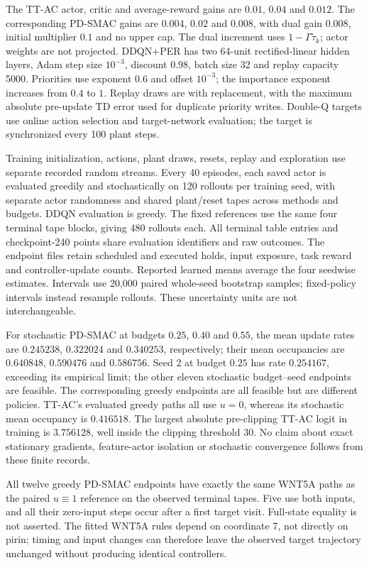\documentclass[11pt]{article}
\newcommand{\1}{\mathbf{1}}
\begin{document}
The TT-AC actor, critic and average-reward gains are $0.01$, $0.04$ and $0.012$. The corresponding PD-SMAC gains are $0.004$, $0.02$ and $0.008$, with dual gain $0.008$, initial multiplier $0.1$ and no upper cap. The dual increment uses $1-\Gamma\tilde\tau_k$; actor weights are not projected. DDQN+PER has two 64-unit rectified-linear hidden layers, Adam step size $10^{-3}$, discount $0.98$, batch size 32 and replay capacity 5000. Priorities use exponent $0.6$ and offset $10^{-3}$; the importance exponent increases from $0.4$ to $1$. Replay draws are with replacement, with the maximum absolute pre-update TD error used for duplicate priority writes. Double-Q targets use online action selection and target-network evaluation; the target is synchronized every 100 plant steps. 

Training initialization, actions, plant draws, resets, replay and exploration use separate recorded random streams. Every 40 episodes, each saved actor is evaluated greedily and stochastically on 120 rollouts per training seed, with separate actor randomness and shared plant/reset tapes across methods and budgets. DDQN evaluation is greedy. The fixed references use the same four terminal tape blocks, giving 480 rollouts each. All terminal table entries and checkpoint-240 points share evaluation identifiers and raw outcomes. The endpoint files retain scheduled and executed holds, input exposure, task reward and controller-update counts. Reported learned means average the four seedwise estimates. Intervals use 20,000 paired whole-seed bootstrap samples; fixed-policy intervals instead resample rollouts. These uncertainty units are not interchangeable.

For stochastic PD-SMAC at budgets $0.25$, $0.40$ and $0.55$, the mean update rates are $0.245238$, $0.322024$ and $0.340253$, respectively; their mean occupancies are $0.640848$, $0.590476$ and $0.586756$. Seed 2 at budget $0.25$ has rate $0.254167$, exceeding its empirical limit; the other eleven stochastic budget--seed endpoints are feasible. The corresponding greedy endpoints are all feasible but are different policies. TT-AC's evaluated greedy paths all use $u=0$, whereas its stochastic mean occupancy is $0.416518$. The largest absolute pre-clipping TT-AC logit in training is $3.756128$, well inside the clipping threshold 30. No claim about exact stationary gradients, feature-actor isolation or stochastic convergence follows from these finite records.

All twelve greedy PD-SMAC endpoints have exactly the same WNT5A paths as the paired $u\equiv1$ reference on the observed terminal tapes. Five use both inputs, and all their zero-input steps occur after a first target visit. Full-state equality is not asserted. The fitted WNT5A rules depend on coordinate 7, not directly on pirin; timing and input changes can therefore leave the observed target trajectory unchanged without producing identical controllers. 
\end{document}
